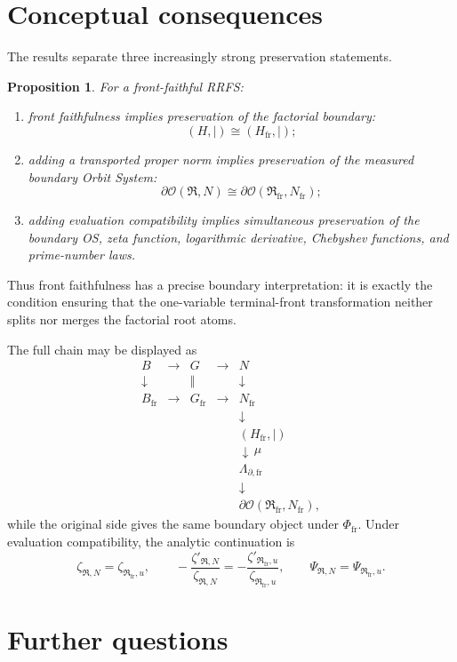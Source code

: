 \documentclass[11pt]{article}
\newcommand{\cR}{\mathfrak R}
\newcommand{\cO}{\mathcal O}
\newcommand{\fr}{\mathrm{fr}}
\newcommand{\bd}{\partial}
\newcommand{\Lam}{\Lambda}
\newcommand{\Mob}{\mu}
\newcommand{\Div}{\mid}
\newtheorem{proposition}[theorem]{Proposition}
\begin{document}
\section{Conceptual consequences}

The results separate three increasingly strong preservation statements.

\begin{proposition}
For a front-faithful RRFS:
\begin{enumerate}[label=(\arabic*)]
\item front faithfulness implies preservation of the factorial boundary:
\[
(H,\Div)\cong(H_{\fr},\Div);
\]
\item adding a transported proper norm implies preservation of the measured boundary Orbit System:
\[
\bd\cO(\cR,N)\cong\bd\cO(\cR_{\fr},N_{\fr});
\]
\item adding evaluation compatibility implies simultaneous preservation of the boundary OS, zeta function, logarithmic derivative, Chebyshev functions, and prime-number laws.
\end{enumerate}
\end{proposition}

Thus front faithfulness has a precise boundary interpretation: it is exactly the condition ensuring that the one-variable terminal-front transformation neither splits nor merges the factorial root atoms.

The full chain may be displayed as
\[
\boxed{
\begin{array}{ccccc}
B&\longrightarrow&G&\longrightarrow&N\\
\downarrow&&\Vert&&\downarrow\\
B_{\fr}&\longrightarrow&G_{\fr}&\longrightarrow&N_{\fr}\\[1mm]
&&&&\downarrow\\
&&&&(H_{\fr},\Div)\\
&&&&\downarrow\,\Mob\\
&&&&\Lam_{\bd,\fr}\\
&&&&\downarrow\\
&&&&\bd\cO(\cR_{\fr},N_{\fr}),
\end{array}}
\]
while the original side gives the same boundary object under $\Phi_{\fr}$. Under evaluation compatibility, the analytic continuation is
\[
\zeta_{\cR,N}
=
\zeta_{\cR_{\fr},u},
\qquad
-\frac{\zeta'_{\cR,N}}{\zeta_{\cR,N}}
=
-\frac{\zeta'_{\cR_{\fr},u}}{\zeta_{\cR_{\fr},u}},
\qquad
\Psi_{\cR,N}=\Psi_{\cR_{\fr},u}.
\]

\section{Further questions}
\end{document}
